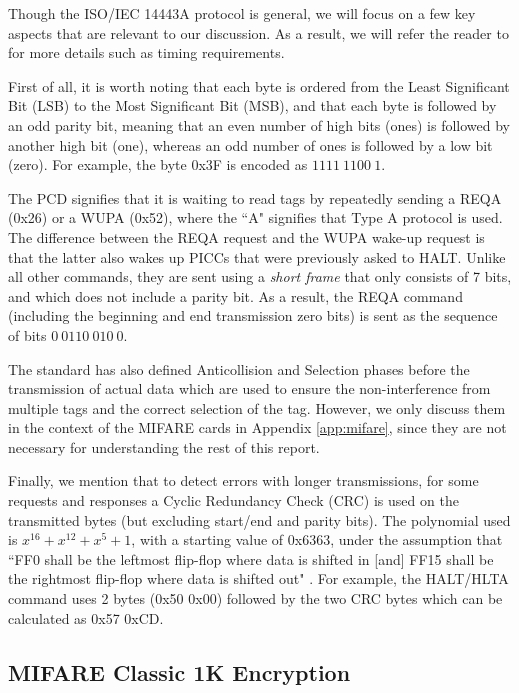 \documentclass[fleqn,10pt]{SelfArx} %
\begin{document}
Though the ISO/IEC 14443A protocol is general, we will focus on a few key aspects that are relevant to our discussion. As a result, we will refer the reader to \cite{iso144433} for more details such as timing requirements.

First of all, it is worth noting that each byte is ordered from the Least Significant Bit (LSB) to the Most Significant Bit (MSB), and that each byte is followed by an odd parity bit, meaning that an even number of high bits (ones) is followed by another high bit (one), whereas an odd number of ones is followed by a low bit (zero). For example, the byte 0x3F is encoded as $1111\ 1100\ 1$.

The PCD signifies that it is waiting to read tags by repeatedly sending a REQA (0x26) or a WUPA (0x52), where the ``A" signifies that Type A protocol is used. The difference between the REQA request and the WUPA wake-up request is that the latter also wakes up PICCs that were previously asked to HALT. Unlike all other commands, they are sent using a {\em short frame} that only consists of 7 bits, and which does not include a parity bit. As a result, the REQA command (including the beginning and end transmission zero bits) is sent as the sequence of bits $0\ 0110\ 010\ 0$.

The standard has also defined Anticollision and Selection phases before the transmission of actual data which are used to ensure the non-interference from multiple tags and the correct selection of the tag. However, we only discuss them in the context of the MIFARE cards in Appendix \ref{app:mifare}, since they are not necessary for understanding the rest of this report. 

Finally, we mention that to detect errors with longer transmissions, for some requests and responses a Cyclic Redundancy Check (CRC) is used on the transmitted bytes (but excluding start/end and parity bits). The polynomial used is $x^{16}+x^{12}+x^5+1$, with a starting value of 0x6363, under the assumption that ``FF0 shall be the leftmost flip-flop where data is shifted in  [and] FF15 shall be the rightmost flip-flop where data is shifted out" \cite{iso144433}. For example, the HALT/HLTA command uses 2 bytes (0x50 0x00) followed by the two CRC bytes which can be calculated as 0x57 0xCD.

\subsection{MIFARE Classic 1K Encryption}
\label{subsec:crypto1}
\end{document}

